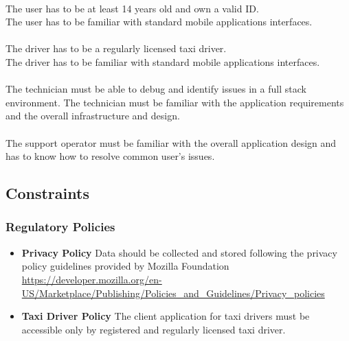\paragraph{} The user has to be at least 14 years old and own a valid ID.\\ 
The user has to be familiar with standard mobile applications interfaces.
\paragraph{} The driver has to be a regularly licensed taxi driver.\\ The driver has to be familiar with standard mobile applications interfaces.
\paragraph{} 
The technician must be able to debug and identify issues in a full stack environment. The technician must be familiar with the application requirements and the overall infrastructure and design.
\paragraph{}  The support operator must be familiar with the overall application design and has to know how to resolve common user's issues.

\subsection{Constraints} 
\label{sub:constraints}

\subsubsection{Regulatory Policies} 
\label{ssub:regulatory_policies}
\begin{itemize}
	\item \textbf{Privacy Policy} Data should be collected and stored following the privacy policy guidelines provided by Mozilla Foundation \url{https://developer.mozilla.org/en-US/Marketplace/Publishing/Policies_and_Guidelines/Privacy_policies}
	\item \textbf{Taxi Driver Policy} The client application for taxi drivers must be accessible only by registered and regularly licensed taxi driver.
\end{itemize}


